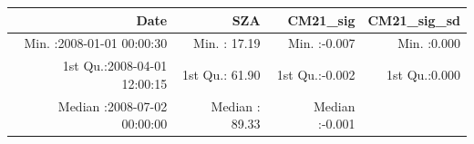 \documentclass[
  10pt,
  a4paper,oneside]{article}
\begin{document}
\begin{longtable}[]{@{}rrrr@{}}
\toprule
\begin{minipage}[b]{0.33\columnwidth}\raggedleft
Date\strut
\end{minipage} & \begin{minipage}[b]{0.19\columnwidth}\raggedleft
SZA\strut
\end{minipage} & \begin{minipage}[b]{0.19\columnwidth}\raggedleft
CM21\_sig\strut
\end{minipage} & \begin{minipage}[b]{0.19\columnwidth}\raggedleft
CM21\_sig\_sd\strut
\end{minipage}\tabularnewline
\midrule
\endhead
\begin{minipage}[t]{0.33\columnwidth}\raggedleft
Min. :2008-01-01 00:00:30\strut
\end{minipage} & \begin{minipage}[t]{0.19\columnwidth}\raggedleft
Min. : 17.19\strut
\end{minipage} & \begin{minipage}[t]{0.19\columnwidth}\raggedleft
Min. :-0.007\strut
\end{minipage} & \begin{minipage}[t]{0.19\columnwidth}\raggedleft
Min. :0.000\strut
\end{minipage}\tabularnewline
\begin{minipage}[t]{0.33\columnwidth}\raggedleft
1st Qu.:2008-04-01 12:00:15\strut
\end{minipage} & \begin{minipage}[t]{0.19\columnwidth}\raggedleft
1st Qu.: 61.90\strut
\end{minipage} & \begin{minipage}[t]{0.19\columnwidth}\raggedleft
1st Qu.:-0.002\strut
\end{minipage} & \begin{minipage}[t]{0.19\columnwidth}\raggedleft
1st Qu.:0.000\strut
\end{minipage}\tabularnewline
\begin{minipage}[t]{0.33\columnwidth}\raggedleft
Median :2008-07-02 00:00:00\strut
\end{minipage} & \begin{minipage}[t]{0.19\columnwidth}\raggedleft
Median : 89.33\strut
\end{minipage} & \begin{minipage}[t]{0.19\columnwidth}\raggedleft
Median :-0.001\strut
\end{minipage} & \begin{minipage}[t]{0.19\columnwidth}\raggedleft

\end{minipage}
\end{longtable}
\end{document}
